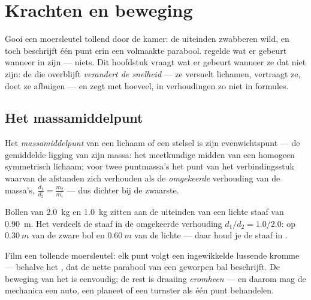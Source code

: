 \chapter{Krachten en beweging}\label{ch:g11:forces-and-motion}

Gooi een moersleutel tollend door de kamer: de uiteinden zwabberen
wild, en toch beschrijft één punt erin een volmaakte parabool.
 regelde wat er gebeurt wanneer  in
 zijn --- niets. Dit hoofdstuk vraagt wat er gebeurt wanneer ze
dat niet zijn: de  die overblijft \emph{verandert de snelheid} ---
ze versnelt lichamen, vertraagt ze, doet ze afbuigen --- en zegt met
hoeveel, in verhoudingen zo niet in formules.

\section{Het massamiddelpunt}

\begin{definition}[Massamiddelpunt]\label{def:g11:forces-and-motion:com}
Het \emph{massamiddelpunt} van een lichaam of een
stelsel is zijn evenwichtspunt --- de gemiddelde ligging van zijn massa:
het meetkundige midden van een homogeen symmetrisch lichaam; voor twee
puntmassa's het punt van het verbindingsstuk waarvan de afstanden zich
verhouden als de \emph{omgekeerde} verhouding van de massa's,
$\frac{d_1}{d_2} = \frac{m_2}{m_1}$ --- dus dichter bij de zwaarste.
\end{definition}

\begin{example}\label{ex:g11:forces-and-motion:dumbbell}
Bollen van \qty{2.0}{kg} en \qty{1.0}{kg} zitten aan de uiteinden van een
lichte staaf van \qty{0.90}{m}. Het  verdeelt de staaf in
de omgekeerde verhouding $d_1/d_2 = 1.0/2.0$: op $\qty{0.30}{m}$ van de
zware bol en $\qty{0.60}{m}$ van de lichte --- daar houd je de staaf in
.
\end{example}

\begin{remark}\label{rem:g11:forces-and-motion:wrench}
Film een tollende moersleutel: elk punt volgt een ingewikkelde lussende
kromme --- behalve het , dat de nette parabool van een
geworpen bal beschrijft. De beweging van het  is
eenvoudig; de rest is draaiing \emph{eromheen} --- en daarom mag de
mechanica een auto, een planeet of een turnster als één punt behandelen.
\end{remark}

